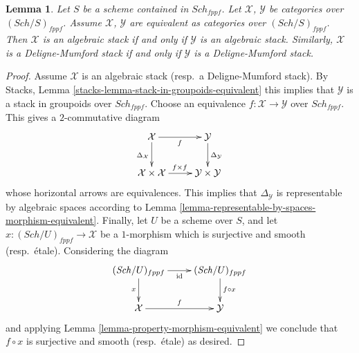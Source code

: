 \documentclass{stacks-project}
\theoremstyle{plain}
\newtheorem{lemma}[subsection]{Lemma}
\theoremstyle{definition}
\theoremstyle{remark}
\numberwithin{equation}{subsection}
\def\Sch{\mathit{Sch}}
\begin{document}
\begin{lemma}
\label{lemma-equivalent}
Let $S$ be a scheme contained in $\Sch_{fppf}$.
Let $\mathcal{X}$, $\mathcal{Y}$ be categories over $(\Sch/S)_{fppf}$.
Assume $\mathcal{X}$, $\mathcal{Y}$ are equivalent as categories over
$(\Sch/S)_{fppf}$. Then $\mathcal{X}$ is an algebraic stack if and
only if $\mathcal{Y}$ is an algebraic stack. Similarly, $\mathcal{X}$
is a Deligne-Mumford stack if and only if $\mathcal{Y}$ is a Deligne-Mumford
stack.
\end{lemma}

\begin{proof}
Assume $\mathcal{X}$ is an algebraic stack (resp.\ a Deligne-Mumford stack). By
Stacks, Lemma \ref{stacks-lemma-stack-in-groupoids-equivalent}
this implies that $\mathcal{Y}$ is a stack in groupoids over
$\Sch_{fppf}$. Choose an equivalence $f : \mathcal{X} \to \mathcal{Y}$
over $\Sch_{fppf}$. This gives a $2$-commutative diagram
$$
\xymatrix{
\mathcal{X} \ar[r]_f \ar[d]_{\Delta_\mathcal{X}} &
\mathcal{Y} \ar[d]^{\Delta_\mathcal{Y}} \\
\mathcal{X} \times \mathcal{X} \ar[r]^{f \times f} &
\mathcal{Y} \times \mathcal{Y}
}
$$
whose horizontal arrows are equivalences. This implies that
$\Delta_\mathcal{Y}$ is representable by algebraic spaces according to
Lemma \ref{lemma-representable-by-spaces-morphism-equivalent}.
Finally, let $U$ be a scheme over $S$, and let
$x : (\Sch/U)_{fppf} \to \mathcal{X}$ be a $1$-morphism which
is surjective and smooth (resp.\ \'etale). Considering the diagram
$$
\xymatrix{
(\Sch/U)_{fppf} \ar[r]_{\text{id}} \ar[d]_x &
(\Sch/U)_{fppf} \ar[d]^{f \circ x} \\
\mathcal{X} \ar[r]^f &
\mathcal{Y}
}
$$
and applying
Lemma \ref{lemma-property-morphism-equivalent}
we conclude that $f \circ x$ is surjective and smooth (resp.\ \'etale)
as desired.
\end{proof}
\end{document}
